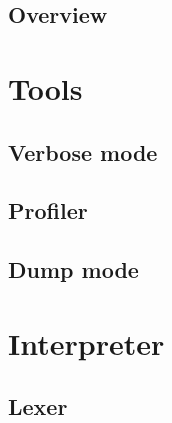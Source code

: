 \documentclass[12pt, oneside]{Thesis}
\begin{document}

\clearpage
{}
\printglossary[title=List of Symbols,toctitle=List of Symbols]



\mainmatter
\pagestyle{fancy}

\clearpage
\chapter{Overview}
\label{Chapt:Overview}


\part{Tools}
\label{Part:Tools}

  \chapter{Verbose mode}
  \label{Chapt:Verbose}
  

  \chapter{Profiler}
  \label{Chapt:Profiler}
  

  \chapter{Dump mode}
  \label{Chapt:Dump-mode}
  

\part{Interpreter}
\label{Part:Interpreter}

  \chapter{Lexer}
  \label{Chapt:Lexer}
\end{document}
